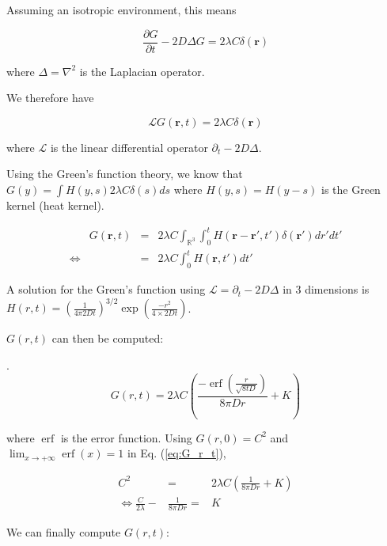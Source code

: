 \documentclass[english]{article}
\DeclareMathOperator\erf{erf}
\begin{document}
Assuming an isotropic environment, this means

\begin{equation}
\frac{\partial G}{\partial t}-2D\Delta G=2\lambda C\delta(\boldsymbol{r})
\end{equation}

where $\Delta=\nabla^{2}$ is the Laplacian operator. 

We therefore have 

\begin{equation}
\mathcal{L}G(\boldsymbol{r},t)=2\lambda C\delta(\boldsymbol{r})
\end{equation}

where $\mathcal{L}$ is the linear differential operator $\partial_{t}-2D\Delta$. 

Using the Green's function theory, we know that $G(y)=\int H(y,s)2\lambda C\delta(s)ds$
where $H(y,s)=H(y-s)$ is the Green kernel (heat kernel).

\begin{align*}
 & G(\boldsymbol{r},t) & = & 2\lambda C\int_{\mathbb{R}^{3}}\int_{0}^{t}H(\boldsymbol{r}-\boldsymbol{r'},t')\delta(\boldsymbol{r'})dr'dt'\\
\Leftrightarrow &  & = & 2\lambda C\int_{0}^{t}H(\boldsymbol{r},t')dt'
\end{align*}

A solution for the Green's function using $\mathcal{L}=\partial_{t}-2D\Delta$
in 3 dimensions is $H(r,t)=\left(\frac{1}{4\pi2Dt}\right)^{3/2}\exp(\frac{-r^{2}}{4\times2Dt})$.

$G(r,t)$ can then be computed:

.
\begin{equation}
G(r,t)=2\lambda C\left(\frac{-\erf\left(\frac{r}{\sqrt{8tD}}\right)}{8\pi Dr}+K\right)\label{eq:G_r_t}
\end{equation}

where $\erf$ is the error function. Using $G(r,0)=C^{2}$ and $\lim_{x\rightarrow+\infty}\erf(x)=1$
in Eq. (\ref{eq:G_r_t}), 

\begin{equation}
\begin{array}{ccc}
C^{2} & = & 2\lambda C\left(\frac{1}{8\pi Dr}+K\right)\\
\Leftrightarrow\frac{C}{2\lambda}- & \frac{1}{8\pi Dr}= & K
\end{array}
\end{equation}

We can finally compute $G(r,t)$:
\end{document}
